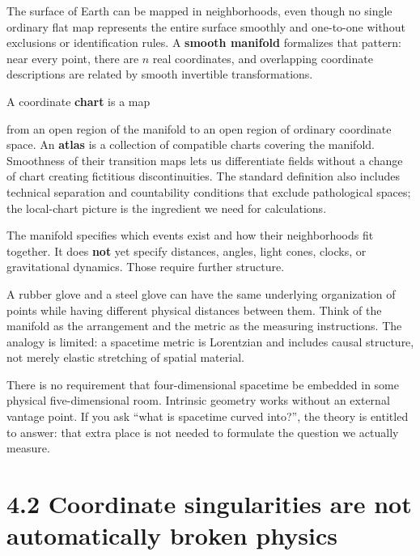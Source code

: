 \documentclass[
  11pt,
  letterpaper,
  oneside,
  openany]{scrbook}
\begin{document}
The surface of Earth can be mapped in neighborhoods, even though no
single ordinary flat map represents the entire surface smoothly and
one-to-one without exclusions or identification rules. A \textbf{smooth
manifold} formalizes that pattern: near every point, there are \(n\)
real coordinates, and overlapping coordinate descriptions are related by
smooth invertible transformations.

A coordinate \textbf{chart} is a map

\begin{center}
\begingroup
{}
\ifdim\wd\grmathbox>\linewidth
\resizebox{\linewidth}{!}{\usebox{\grmathbox}}
\else\usebox{\grmathbox}\fi
\endgroup
\end{center}

from an open region of the manifold to an open region of ordinary
coordinate space. An \textbf{atlas} is a collection of compatible charts
covering the manifold. Smoothness of their transition maps lets us
differentiate fields without a change of chart creating fictitious
discontinuities. The standard definition also includes technical
separation and countability conditions that exclude pathological spaces;
the local-chart picture is the ingredient we need for calculations.

The manifold specifies which events exist and how their neighborhoods
fit together. It does \textbf{not} yet specify distances, angles, light
cones, clocks, or gravitational dynamics. Those require further
structure.

A rubber glove and a steel glove can have the same underlying
organization of points while having different physical distances between
them. Think of the manifold as the arrangement and the metric as the
measuring instructions. The analogy is limited: a spacetime metric is
Lorentzian and includes causal structure, not merely elastic stretching
of spatial material.

There is no requirement that four-dimensional spacetime be embedded in
some physical five-dimensional room. Intrinsic geometry works without an
external vantage point. If you ask ``what is spacetime curved into?'',
the theory is entitled to answer: that extra place is not needed to
formulate the question we actually measure.

\hypertarget{coordinate-singularities-are-not-automatically-broken-physics}{%
\section{4.2 Coordinate singularities are not automatically broken
physics}\label{coordinate-singularities-are-not-automatically-broken-physics}}
\end{document}
